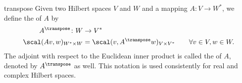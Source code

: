 \begin{Notation}{transpose}
  Given two Hilbert spaces $V$ and $W$ and a mapping $A\colon V\to W^*$,
  we define the  of $A$ by
  \begin{gather}
    \begin{split}
      A^\transpose\colon W &\to V^* \\
      \scal(Av,w)_{W^*\times W} &= \scal(v,A^\transpose w)_{V\times V^*}
      \qquad \forall v\in V, w\in W.
    \end{split}
  \end{gather}
  The adjoint with respect to the Euclidean inner product is called
  the  of $A$, denoted by $A^\transpose$ as
  well. This notation is used consistently for real and complex
  Hilbert spaces.
\end{Notation}


